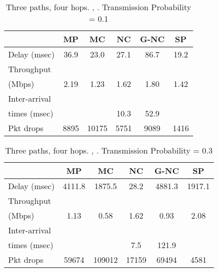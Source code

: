\documentclass[journal, onecolumn, 12pt]{IEEEtran}
\begin{document}
\begin{table}[hb]
\begin{center}
\scriptsize
\begin{tabular}{|l|c|c|c|c|c|}
\hline
~                                    & MP & MC & NC & G-NC & SP \\ \hline
Delay (msec)   & 36.9  & 23.0  & 27.1  & 86.7 & 19.2  \\ \hline
Throughput                   & ~  & ~  & ~  & ~         & ~  \\
(Mbps)                   & 2.19  & 1.23  & 1.62 & 1.80 & 1.42 \\ \hline
Inter-arrival              & ~  & ~  & ~  & ~         & ~  \\
times (msec)   &   &   &  10.3 & 52.9 & \\ \hline
Pkt drops  & 8895  & 10175  & 5751  & 9089 & 1416 \\ \hline
\end{tabular}
\end{center}
\caption {Three paths, four hops. , . Transmission Probability = 0.1}
\label{tab:sim_topol_1_0.1}
\end{table}

\begin{table}[hb]
\begin{center}
\scriptsize
\begin{tabular}{|l|c|c|c|c|c|}
\hline
~                                    & MP & MC & NC & G-NC & SP \\ \hline
Delay (msec)   & 4111.8   & 1875.5 & 28.2 & 4881.3 & 1917.1 \\ \hline
Throughput                   & ~  & ~  & ~  & ~         & ~  \\
(Mbps)                   & 1.13  & 0.58  & 1.62 & 0.93 & 2.08 \\ \hline
Inter-arrival              & ~  & ~  & ~  & ~         & ~  \\
times (msec)   &   &   &  7.5 & 121.9 & \\ \hline
Pkt drops  & 59674  & 109012  & 17159  & 69494 & 4581 \\ \hline
\end{tabular}
\end{center}
\caption {Three paths, four hops. , . Transmission Probability = 0.3}
\label{tab:sim_topol_1_0.3}
\end{table}
\end{document}

